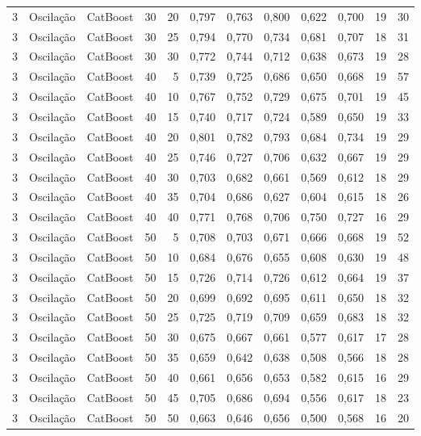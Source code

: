 \begin{longtable}{@{}rllrrrrrrrrr@{}}
3 & Oscilação & CatBoost & 30 & 20 & 0,797 & 0,763 & 0,800 & 0,622 & 0,700 & 19 & 30 \\
3 & Oscilação & CatBoost & 30 & 25 & 0,794 & 0,770 & 0,734 & 0,681 & 0,707 & 18 & 31 \\
3 & Oscilação & CatBoost & 30 & 30 & 0,772 & 0,744 & 0,712 & 0,638 & 0,673 & 19 & 28 \\
3 & Oscilação & CatBoost & 40 & 5 & 0,739 & 0,725 & 0,686 & 0,650 & 0,668 & 19 & 57 \\
3 & Oscilação & CatBoost & 40 & 10 & 0,767 & 0,752 & 0,729 & 0,675 & 0,701 & 19 & 45 \\
3 & Oscilação & CatBoost & 40 & 15 & 0,740 & 0,717 & 0,724 & 0,589 & 0,650 & 19 & 33 \\
3 & Oscilação & CatBoost & 40 & 20 & 0,801 & 0,782 & 0,793 & 0,684 & 0,734 & 19 & 29 \\
3 & Oscilação & CatBoost & 40 & 25 & 0,746 & 0,727 & 0,706 & 0,632 & 0,667 & 19 & 29 \\
3 & Oscilação & CatBoost & 40 & 30 & 0,703 & 0,682 & 0,661 & 0,569 & 0,612 & 18 & 29 \\
3 & Oscilação & CatBoost & 40 & 35 & 0,704 & 0,686 & 0,627 & 0,604 & 0,615 & 18 & 26 \\
3 & Oscilação & CatBoost & 40 & 40 & 0,771 & 0,768 & 0,706 & 0,750 & 0,727 & 16 & 29 \\
3 & Oscilação & CatBoost & 50 & 5 & 0,708 & 0,703 & 0,671 & 0,666 & 0,668 & 19 & 52 \\
3 & Oscilação & CatBoost & 50 & 10 & 0,684 & 0,676 & 0,655 & 0,608 & 0,630 & 19 & 48 \\
3 & Oscilação & CatBoost & 50 & 15 & 0,726 & 0,714 & 0,726 & 0,612 & 0,664 & 19 & 37 \\
3 & Oscilação & CatBoost & 50 & 20 & 0,699 & 0,692 & 0,695 & 0,611 & 0,650 & 18 & 32 \\
3 & Oscilação & CatBoost & 50 & 25 & 0,725 & 0,719 & 0,709 & 0,659 & 0,683 & 18 & 32 \\
3 & Oscilação & CatBoost & 50 & 30 & 0,675 & 0,667 & 0,661 & 0,577 & 0,617 & 17 & 28 \\
3 & Oscilação & CatBoost & 50 & 35 & 0,659 & 0,642 & 0,638 & 0,508 & 0,566 & 18 & 28 \\
3 & Oscilação & CatBoost & 50 & 40 & 0,661 & 0,656 & 0,653 & 0,582 & 0,615 & 16 & 29 \\
3 & Oscilação & CatBoost & 50 & 45 & 0,705 & 0,686 & 0,694 & 0,556 & 0,617 & 18 & 23 \\
3 & Oscilação & CatBoost & 50 & 50 & 0,663 & 0,646 & 0,656 & 0,500 & 0,568 & 16 & 20 \\

\end{longtable}
